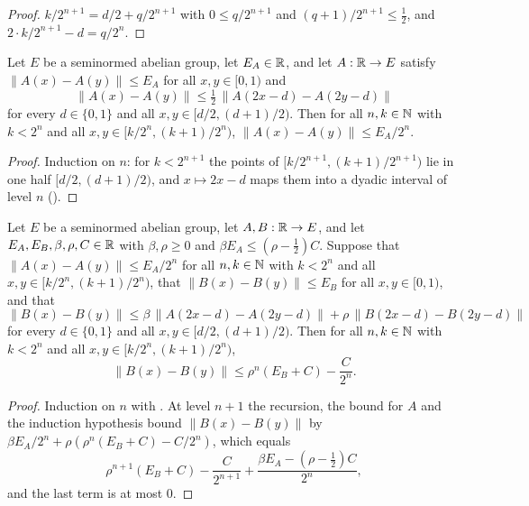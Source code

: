 \begin{proof}
\leanok
$k/2^{n+1} = d/2 + q/2^{n+1}$ with $0 \leq q/2^{n+1}$ and $(q+1)/2^{n+1} \leq \frac12$, and
$2 \cdot k/2^{n+1} - d = q/2^n$.
\end{proof}

\begin{lemma}
\label{lem:daub-descent-halving}
\leanok
Let $E$ be a seminormed abelian group, let $E_A \in \mathbb{R}$, and let $A : \mathbb{R} \to E$ satisfy
$\|A(x) - A(y)\| \leq E_A$ for all $x, y \in [0, 1)$ and
\[
  \|A(x) - A(y)\| \leq \tfrac12 \, \|A(2x - d) - A(2y - d)\|
\]
for every $d \in \{0, 1\}$ and all $x, y \in [d/2, (d+1)/2)$. Then for all $n, k \in \mathbb{N}$ with
$k < 2^n$ and all $x, y \in [k/2^n, (k+1)/2^n)$, $\|A(x) - A(y)\| \leq E_A/2^n$.
\end{lemma}

\begin{proof}
\leanok
{}
Induction on $n$: for $k < 2^{n+1}$ the points of $[k/2^{n+1}, (k+1)/2^{n+1})$ lie in one half
$[d/2, (d+1)/2)$, and $x \mapsto 2x - d$ maps them into a dyadic interval of level $n$
().
\end{proof}

\begin{lemma}
\label{lem:daub-descent-triangular}
\leanok
Let $E$ be a seminormed abelian group, let $A, B : \mathbb{R} \to E$, and let
$E_A, E_B, \beta, \rho, C \in \mathbb{R}$ with $\beta, \rho \geq 0$ and
$\beta E_A \leq (\rho - \frac12) C$. Suppose that $\|A(x) - A(y)\| \leq E_A/2^n$ for all
$n, k \in \mathbb{N}$ with $k < 2^n$ and all $x, y \in [k/2^n, (k+1)/2^n)$, that
$\|B(x) - B(y)\| \leq E_B$ for all $x, y \in [0, 1)$, and that
\[
  \|B(x) - B(y)\| \leq \beta \, \|A(2x - d) - A(2y - d)\| + \rho \, \|B(2x - d) - B(2y - d)\|
\]
for every $d \in \{0, 1\}$ and all $x, y \in [d/2, (d+1)/2)$. Then for all $n, k \in \mathbb{N}$ with
$k < 2^n$ and all $x, y \in [k/2^n, (k+1)/2^n)$,
\[
  \|B(x) - B(y)\| \leq \rho^n (E_B + C) - \frac{C}{2^n} .
\]
\end{lemma}

\begin{proof}
\leanok
{}
Induction on $n$ with . At level $n + 1$ the recursion, the
bound for $A$ and the induction hypothesis bound $\|B(x) - B(y)\|$ by
$\beta E_A/2^n + \rho (\rho^n (E_B + C) - C/2^n)$, which equals
\[
  \rho^{n+1} (E_B + C) - \frac{C}{2^{n+1}} + \frac{\beta E_A - (\rho - \frac12) C}{2^n} ,
\]
and the last term is at most $0$.
\end{proof}

